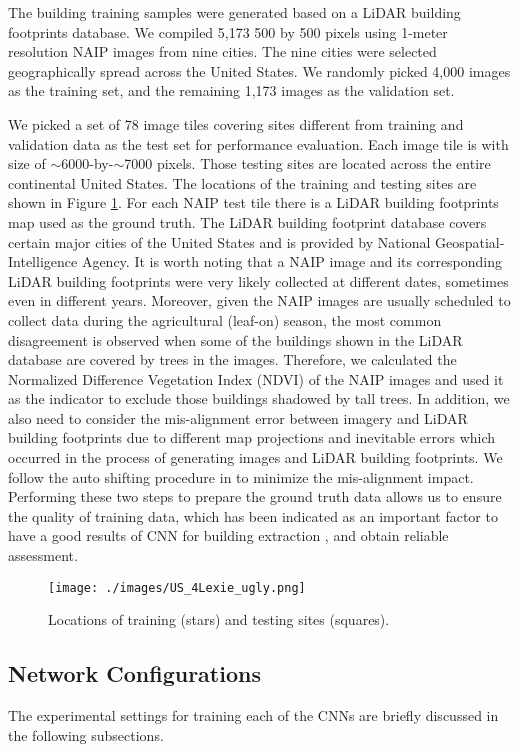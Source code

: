 \documentclass[journal]{IEEEtran}
\begin{document}
The building training samples were generated based on a LiDAR building footprints database. We compiled 5,173 500 by 500 pixels using 1-meter resolution NAIP images from nine cities. The nine cities were selected geographically spread across the United States. We randomly picked 4,000 images as the training set, and the remaining 1,173 images as the validation set.

We picked a set of 78 image tiles covering sites different from training and validation data as the test set for performance evaluation. Each image tile is with size of $\sim$6000-by-$\sim$7000 pixels. Those testing sites are located across the entire continental United States. The locations of the training and testing sites are shown in Figure \ref{fig:loc_train_test}.  For each NAIP test tile there is a LiDAR building footprints map used as the ground truth. The LiDAR building footprint database covers certain major cities of the United States and is provided by National Geospatial-Intelligence Agency. It is worth noting that a NAIP image and its corresponding LiDAR building footprints were very likely collected at different dates, sometimes even in different years. Moreover, given the NAIP images are usually scheduled to collect data during the agricultural (leaf-on) season, the most common disagreement is observed when some of the buildings shown in the LiDAR database are covered by trees in the images. Therefore, we calculated the Normalized Difference Vegetation Index (NDVI) of the NAIP images and used it as the indicator to exclude those buildings shadowed by tall trees. In addition, we also need to consider the mis-alignment error between imagery and LiDAR building footprints due to different map projections and inevitable errors which occurred in the process of generating images and LiDAR building footprints. We follow the auto shifting procedure in \cite{YuanCheriyadat2014} to minimize the mis-alignment impact. Performing these two steps to prepare the ground truth data allows us to ensure the quality of training data, which has been indicated as an important factor to have a good results of CNN for building extraction \cite{MaggioriTarabalkaCharpiatEtAl2016}, and obtain reliable assessment. 
\begin{figure}
	\texttt{[image: ./images/US\_4Lexie\_ugly.png]}
\caption{Locations of training (stars) and testing sites (squares).}
\label{fig:loc_train_test}
\end{figure}

\subsection{Network Configurations}
The experimental settings for training each of the CNNs are briefly discussed in the following subsections.   
\end{document}
